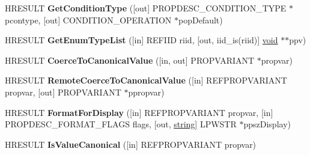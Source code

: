 \begin{DoxyCompactItemize}
\item 
\mbox{\label{interface_i_property_description_afbeafe2e961df42d07859bb737dc54bd}} 
H\+R\+E\+S\+U\+LT {\bfseries Get\+Condition\+Type} (\mbox{[}out\mbox{]} P\+R\+O\+P\+D\+E\+S\+C\+\_\+\+C\+O\+N\+D\+I\+T\+I\+O\+N\+\_\+\+T\+Y\+PE $\ast$pcontype, \mbox{[}out\mbox{]} C\+O\+N\+D\+I\+T\+I\+O\+N\+\_\+\+O\+P\+E\+R\+A\+T\+I\+ON $\ast$pop\+Default)
\item 
\mbox{\label{interface_i_property_description_abb13adf9a82503303721361ba0af235f}} 
H\+R\+E\+S\+U\+LT {\bfseries Get\+Enum\+Type\+List} (\mbox{[}in\mbox{]} R\+E\+F\+I\+ID riid, \mbox{[}out, iid\+\_\+is(riid)\mbox{]} \hyperlink{interfacevoid}{void} $\ast$$\ast$ppv)
\item 
\mbox{\label{interface_i_property_description_a898361a080f54e370abeca678ba87f34}} 
H\+R\+E\+S\+U\+LT {\bfseries Coerce\+To\+Canonical\+Value} (\mbox{[}in, out\mbox{]} P\+R\+O\+P\+V\+A\+R\+I\+A\+NT $\ast$propvar)
\item 
\mbox{\label{interface_i_property_description_a92059002de58f1fe4e82029b8e834125}} 
H\+R\+E\+S\+U\+LT {\bfseries Remote\+Coerce\+To\+Canonical\+Value} (\mbox{[}in\mbox{]} R\+E\+F\+P\+R\+O\+P\+V\+A\+R\+I\+A\+NT propvar, \mbox{[}out\mbox{]} P\+R\+O\+P\+V\+A\+R\+I\+A\+NT $\ast$ppropvar)
\item 
\mbox{\label{interface_i_property_description_a3ed67e7b98c11425a75fd671cdcd4f1c}} 
H\+R\+E\+S\+U\+LT {\bfseries Format\+For\+Display} (\mbox{[}in\mbox{]} R\+E\+F\+P\+R\+O\+P\+V\+A\+R\+I\+A\+NT propvar, \mbox{[}in\mbox{]} P\+R\+O\+P\+D\+E\+S\+C\+\_\+\+F\+O\+R\+M\+A\+T\+\_\+\+F\+L\+A\+GS flags, \mbox{[}out, \hyperlink{structstring}{string}\mbox{]} L\+P\+W\+S\+TR $\ast$ppsz\+Display)
\item 
\mbox{\label{interface_i_property_description_a2243d2167886d1ced4cb4ddaf1773a1b}} 
H\+R\+E\+S\+U\+LT {\bfseries Is\+Value\+Canonical} (\mbox{[}in\mbox{]} R\+E\+F\+P\+R\+O\+P\+V\+A\+R\+I\+A\+NT propvar)
\end{DoxyCompactItemize}
